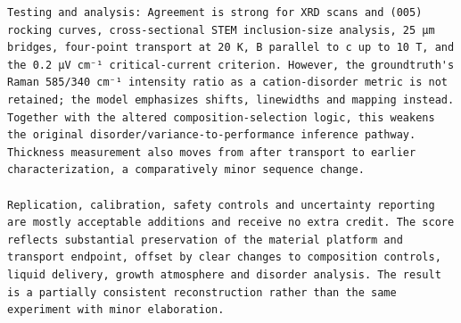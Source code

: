 \begin{lstlisting}[style=jsonstyle,basicstyle=\fontsize{8}{9.6}\selectfont\ttfamily,backgroundcolor=\color{white}]
Testing and analysis: Agreement is strong for XRD scans and (005) rocking curves, cross-sectional STEM inclusion-size analysis, 25 µm bridges, four-point transport at 20 K, B parallel to c up to 10 T, and the 0.2 µV cm⁻¹ critical-current criterion. However, the groundtruth's Raman 585/340 cm⁻¹ intensity ratio as a cation-disorder metric is not retained; the model emphasizes shifts, linewidths and mapping instead. Together with the altered composition-selection logic, this weakens the original disorder/variance-to-performance inference pathway. Thickness measurement also moves from after transport to earlier characterization, a comparatively minor sequence change.

Replication, calibration, safety controls and uncertainty reporting are mostly acceptable additions and receive no extra credit. The score reflects substantial preservation of the material platform and transport endpoint, offset by clear changes to composition controls, liquid delivery, growth atmosphere and disorder analysis. The result is a partially consistent reconstruction rather than the same experiment with minor elaboration.
\end{lstlisting}


\clearpage
